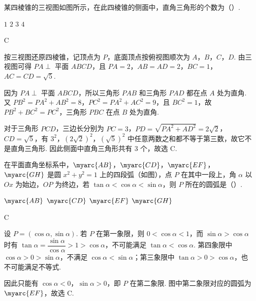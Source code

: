 \begin{problem}
某四棱锥的三视图如图所示，在此四棱锥的侧面中，直角三角形的个数为（\quad）.

\begingroup
{}
\endgroup
\FloatBarrier

\choices
    {\(1\)}
    {\(2\)}
    {\(3\)}
    {\(4\)}
\end{problem}

\begin{answer}
C
\end{answer}

\begin{solution}
按三视图还原四棱锥，记顶点为 \(P\)，底面顶点按俯视图顺次为 \(A\)，\(B\)，\(C\)，\(D\). 由三视图可得 \(PA\perp\) 平面 \(ABCD\)，且 \(PA=2\)，\(AB=AD=2\)，\(BC=1\)，\(AC=CD=\sqrt5\).

因为 \(PA\perp\) 平面 \(ABCD\)，所以三角形 \(PAB\) 和三角形 \(PAD\) 都在点 \(A\) 处为直角. 又 \(PB^2=PA^2+AB^2=8\)，\(PC^2=PA^2+AC^2=9\)，且 \(BC^2=1\)，故 \(PB^2+BC^2=PC^2\)，三角形 \(PBC\) 在点 \(B\) 处为直角.

对于三角形 \(PCD\)，三边长分别为 \(PC=3\)，\(PD=\sqrt{PA^2+AD^2}=2\sqrt2\)，\(CD=\sqrt5\)，有 \(3^2\)，\((2\sqrt2)^2\)，\((\sqrt5)^2\) 中任意两数之和都不等于第三数，故它不是直角三角形. 因此侧面中直角三角形共有 \(3\) 个，故选 C.
\end{solution}


\begin{problem}
在平面直角坐标系中，\(\myarc{AB}\)，\(\myarc{CD}\)，\(\myarc{EF}\)，\(\myarc{GH}\) 是圆 \(x^2+y^2=1\) 上的四段弧（如图），点 \(P\) 在其中一段上，角 \(\alpha\) 以 \(Ox\) 为始边，\(OP\) 为终边，若 \(\tan\alpha<\cos\alpha<\sin\alpha\)，则 \(P\) 所在的圆弧是（\quad）.

\begingroup
{}
\endgroup

\choices
    {\(\myarc{AB}\)}
    {\(\myarc{CD}\)}
    {\(\myarc{EF}\)}
    {\(\myarc{GH}\)}
\end{problem}

\begin{answer}
C
\end{answer}

\begin{solution}
设 \(P=(\cos\alpha,\sin\alpha)\). 若 \(P\) 在第一象限，则 \(0<\cos\alpha<1\)，而 \(\sin\alpha>\cos\alpha\) 时有 \(\tan\alpha=\dfrac{\sin\alpha}{\cos\alpha}>1>\cos\alpha\)，不可能满足 \(\tan\alpha<\cos\alpha\). 第四象限中 \(\cos\alpha>0>\sin\alpha\)，不满足 \(\cos\alpha<\sin\alpha\)；第三象限中 \(\tan\alpha>0>\cos\alpha\)，也不可能满足不等式.

因此只能有 \(\cos\alpha<0\)，\(\sin\alpha>0\)，即 \(P\) 在第二象限. 图中第二象限对应的圆弧为 \(\myarc{EF}\)，故选 C.
\end{solution}


